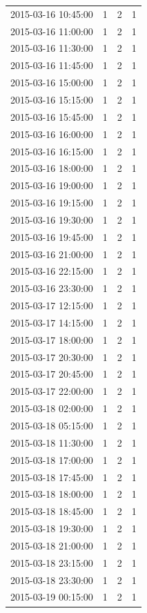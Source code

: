 \begin{tabular}{lrrr}
2015-03-16 10:45:00 & 1 & 2 & 1 \\
2015-03-16 11:00:00 & 1 & 2 & 1 \\
2015-03-16 11:30:00 & 1 & 2 & 1 \\
2015-03-16 11:45:00 & 1 & 2 & 1 \\
2015-03-16 15:00:00 & 1 & 2 & 1 \\
2015-03-16 15:15:00 & 1 & 2 & 1 \\
2015-03-16 15:45:00 & 1 & 2 & 1 \\
2015-03-16 16:00:00 & 1 & 2 & 1 \\
2015-03-16 16:15:00 & 1 & 2 & 1 \\
2015-03-16 18:00:00 & 1 & 2 & 1 \\
2015-03-16 19:00:00 & 1 & 2 & 1 \\
2015-03-16 19:15:00 & 1 & 2 & 1 \\
2015-03-16 19:30:00 & 1 & 2 & 1 \\
2015-03-16 19:45:00 & 1 & 2 & 1 \\
2015-03-16 21:00:00 & 1 & 2 & 1 \\
2015-03-16 22:15:00 & 1 & 2 & 1 \\
2015-03-16 23:30:00 & 1 & 2 & 1 \\
2015-03-17 12:15:00 & 1 & 2 & 1 \\
2015-03-17 14:15:00 & 1 & 2 & 1 \\
2015-03-17 18:00:00 & 1 & 2 & 1 \\
2015-03-17 20:30:00 & 1 & 2 & 1 \\
2015-03-17 20:45:00 & 1 & 2 & 1 \\
2015-03-17 22:00:00 & 1 & 2 & 1 \\
2015-03-18 02:00:00 & 1 & 2 & 1 \\
2015-03-18 05:15:00 & 1 & 2 & 1 \\
2015-03-18 11:30:00 & 1 & 2 & 1 \\
2015-03-18 17:00:00 & 1 & 2 & 1 \\
2015-03-18 17:45:00 & 1 & 2 & 1 \\
2015-03-18 18:00:00 & 1 & 2 & 1 \\
2015-03-18 18:45:00 & 1 & 2 & 1 \\
2015-03-18 19:30:00 & 1 & 2 & 1 \\
2015-03-18 21:00:00 & 1 & 2 & 1 \\
2015-03-18 23:15:00 & 1 & 2 & 1 \\
2015-03-18 23:30:00 & 1 & 2 & 1 \\
2015-03-19 00:15:00 & 1 & 2 & 1 \\

\end{tabular}

